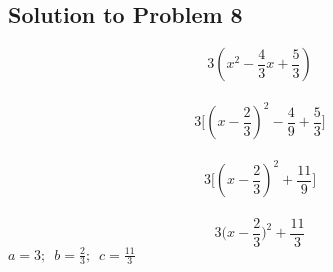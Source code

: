 \documentclass{article}
\begin{document}
\subsection{Solution to Problem 8}
$$ 3(x^2 - \frac{4}{3}x + \frac{5}{3})$$ \\
$$ 3 \Big[ (x - \frac{2}{3})^2 -\frac{4}{9} + \frac{5}{3} \Big] $$ \\
$$ 3 \Big[ (x - \frac{2}{3})^2 + \frac{11}{9} \Big]  $$ \\
$$ 3 \big(x - \frac{2}{3}\big)^2 + \frac{11}{3}  $$
$ a =3; \enspace b= \frac{2}{3}; \enspace c= \frac{11}{3} $
\end{document}
